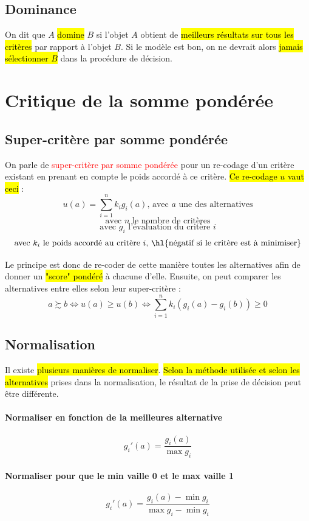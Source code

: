 \documentclass[a4paper, 12pt]{article}
\newcommand{\alinea}{
\hspace*{0.5cm}}
\newcommand{\red}[1]{
	\textcolor{red}{#1}}
\begin{document}
	\subsection{Dominance}
		\alinea On dit que $A$ \red{\hl{domine}} $B$ si l'objet $A$ obtient de \hl{meilleurs résultats sur tous les critères} 
			par rapport à l'objet $B$. Si le modèle est bon, on ne devrait alors \hl{jamais sélectionner $B$} dans la procédure de 
			décision.
%
\section{Critique de la somme pondérée}
	\subsection{Super-critère par somme pondérée}
		\alinea On parle de \red{super-critère par somme pondérée} pour un re-codage d'un critère existant en prenant en compte
			le poids accordé à ce critère. \hl{Ce re-codage $u$ vaut ceci} :
			$$ u(a) = \sum\limits_{i=1}^{n} k_i g_i (a)\text{, avec } a \text{ une des alternatives} $$
			$$ \text{avec } n \text{ le nombre de critères}$$			
			$$ \text{avec } g_i \text{ l'évaluation du critère } i $$
			$$ \text{avec } k_i \text{ le poids accordé au critère } i \text{, \hl{négatif si le critère est à minimiser}}$$
		\alinea Le principe est donc de re-coder de cette manière toutes les alternatives afin de donner un \hl{"score" pondéré}
			à chacune d'elle. Ensuite, on peut comparer les alternatives entre elles selon leur super-critère : 
			$$ a \succsim b \Leftrightarrow u(a) \geqslant u(b) \Leftrightarrow \sum\limits_{i=1}^{n} k_i (g_i (a) - g_i (b)) \geqslant 0$$
	\subsection{Normalisation}
		\alinea Il existe \hl{plusieurs manières de normaliser}. \hl{Selon la méthode utilisée et selon les alternatives} prises dans la
			normalisation, le résultat de la prise de décision peut être différente. 
			\paragraph{Normaliser en fonction de la meilleures alternative}
				$$ g_i'(a) = \frac{g_i(a)}{\max g_i} $$
			\paragraph{Normaliser pour que le min vaille 0 et le max vaille 1}
				$$ g_i'(a) = \frac{g_i(a) - \min g_i}{\max g_i - \min g_i} $$
\end{document}
